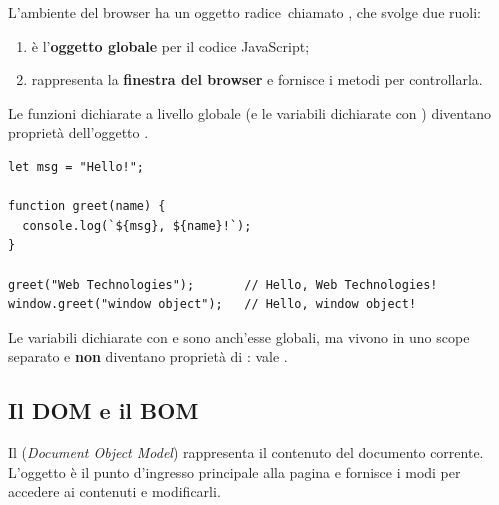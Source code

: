 L'ambiente del browser ha un oggetto \guillemotleft radice\guillemotright\ chiamato ,
che svolge due ruoli:

\begin{enumerate}
  \item è l'\textbf{oggetto globale} per il codice JavaScript;
  \item rappresenta la \textbf{finestra del browser} e fornisce i metodi per
        controllarla.
\end{enumerate}

Le funzioni dichiarate a livello globale (e le variabili dichiarate con
) diventano proprietà dell'oggetto .

\begin{affianco}[0.55][c]
\begin{lstlisting}[style=js, name=window.js]
let msg = "Hello!";

function greet(name) {
  console.log(`${msg}, ${name}!`);
}

greet("Web Technologies");       // Hello, Web Technologies!
window.greet("window object");   // Hello, window object!
\end{lstlisting}
\risultato
\begin{immagine}
\end{immagine}
\end{affianco}

Le variabili dichiarate con  e  sono anch'esse globali,
ma vivono in uno scope separato e \textbf{non} diventano proprietà di
:  vale .

\subsection{Il DOM e il BOM}

Il  (\textit{Document Object Model}) rappresenta il contenuto del
documento corrente. L'oggetto  è il punto d'ingresso principale
alla pagina e fornisce i modi per accedere ai contenuti e modificarli.


